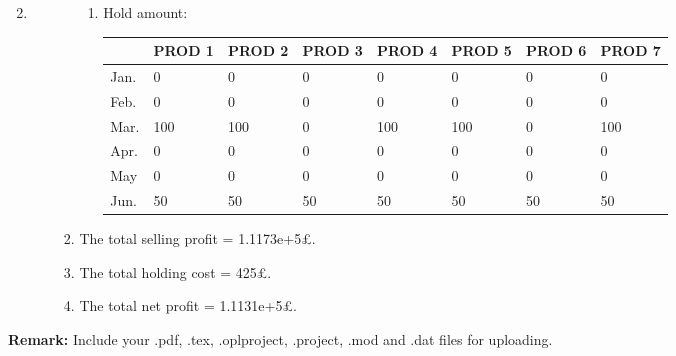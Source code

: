 \documentclass[12pt,a4paper]{article}
\makeatletter
\newtheorem*{solution}{Solution}
\theoremstyle{definition}
\renewenvironment{solution}[1][Solution] {\par\pushQED{\qed}\normalfont\topsep6\p@\@plus6\p@\relax\trivlist\item[\hskip\labelsep\bfseries#1\@addpunct{.}]\ignorespaces}{\popQED\endtrivlist\@endpefalse} \makeatother
\makeatother
\begin{document}
\begin{enumerate}
\begin{solution}
\begin{enumerate}
\begin{enumerate}
\begin{enumerate}
					\item Hold amount:
					\newpage
					\begin{table}[ht]
					\scriptsize
					\centering
					\renewcommand\arraystretch{1.1}
					\begin{tabular}{m{} m{0.09\textwidth}<{\centering} m{}<{\centering} m{}<{\centering} m{}<{\centering} m{}<{\centering} m{}<{\centering} m{}<{\centering}}
						\hline
						& \textbf{PROD 1} & \textbf{PROD 2} & \textbf{PROD 3} & \textbf{PROD 4} & \textbf{PROD 5} & \textbf{PROD 6} &  \textbf{PROD 7} \\\hline
						Jan. & 0&0&0&0&0&0&0\\
						Feb. & 0&0&0&0&0&0&0 \\
						Mar. & 100&100&0&100&100&0&100 \\
						Apr. & 0&0&0&0&0&0&0 \\
						May & 0&0&0&0&0&0&0 \\
						Jun. & 50 & 50 & 50 & 50 & 50 & 50 & 50\\
						\hline
					\end{tabular}
				\end{table}
				\end{enumerate}
				\item
				The total selling profit = 1.1173e+5\pounds.
				\item
				The total holding cost = 425\pounds.
				\item
				The total net profit  = 1.1131e+5\pounds.
			\end{enumerate}
		
		\end{enumerate}
	
	\end{solution}

\end{enumerate}


\textbf{Remark:} Include your .pdf, .tex, .oplproject, .project, .mod and .dat files for uploading.


\end{document}
